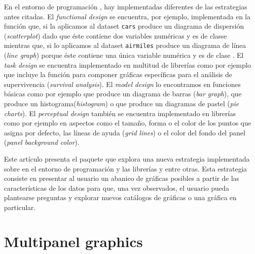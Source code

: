 \documentclass[jss]{jss}
\begin{document}
En el entorno de programación , hay implementadas diferentes
de las estrategias antes citadas. El \emph{functional design} se
encuentra, por ejemplo, implementada en la función  que, si
la aplicamos al dataset \texttt{cars} produce un diagrama de dispersión
(\emph{scatterplot}) dado que éste contiene dos variables numéricas y es
de classe  mientras que, si lo aplicamos al dataset
\texttt{airmiles} produce un diagrama de línea (\emph{line graph})
porque éste contiene una única variable numérica y es de clase
. El \emph{task design} se encuentra implementado en multitud
de librerías como por ejemplo  \citep{Therneau2015} que
incluye la función  para componer gráficas
específicas para el análisis de supervivencia (\emph{survival
analysis}). El \emph{model design} lo encontramos en funciones básicas
como por ejemplo  que produce un diagrama de barras
(\emph{bar graph}),  que produce un
histograma(\emph{histogram}) o  que produce un diagramas de
pastel (\emph{pie charts}). El \emph{perceptual design} también se
encuentra implementado en librerías como por ejemplo 
\citep{Wickham2016} en aspectos como el tamaño, forma o el color de los
puntos que asigna por defecto, las líneas de ayuda (\emph{grid lines}) o
el color del fondo del panel (\emph{panel background color}).

Este artículo presenta el paquete  que explora una nueva
estrategia implementada sobre en el entorno de programación 
y las librerías  y  entre otras. Esta
estrategia consiste en presentar al usuario un abanico de gráficas
posibles a partir de las características de los datos para que, una vez
observados, el usuario pueda plantearse preguntas y explorar nuevos
catálogos de gráficas o una gráfica en particular.

\hypertarget{multipanel-graphics}{%
\section{Multipanel graphics}\label{multipanel-graphics}}
\end{document}
